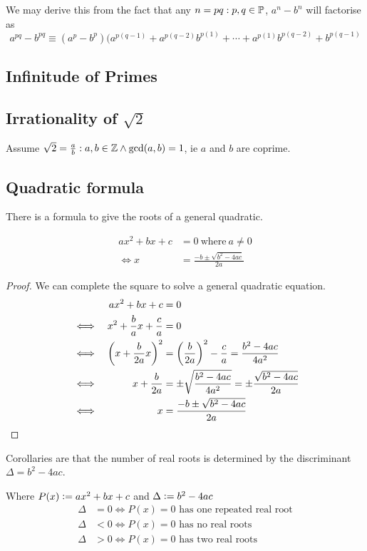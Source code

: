 We may derive this from the fact that any \(n = pq: p, q \in \mathbb P\),
\(a^n - b^n\) will factorise as
\begin{equation}
a^{pq} - b^{pq} \equiv
 (a^p - b^p)(a^{p(q - 1)} + a^{p(q - 2)}b^{p(1)} + \dotsb +
             a^{p(1)}b^{p(q - 2)} + b^{p(q - 1)}
\end{equation}

\subsection{Infinitude of Primes}

\subsection[Irrationality of \(\sqrt 2\)]
           {Irrationality of \boldmath\(\sqrt 2\)}

Assume \(\sqrt 2 = \frac ab : a, b \in \mathbb Z \land \gcd(a, b) = 1\), ie
\(a\) and \(b\) are coprime.

\subsection{Quadratic formula} \label{sec_quad_formula}

There is a formula to give the roots of a general quadratic.
\begin{theorem}
\begin{align*}
ax^2 + bx + c &= 0\ \text{where}\ a \neq 0 \\
\iff x &= \frac{-b \pm \sqrt{b^2 - 4ac}}{2a}
\end{align*}
\end{theorem}
\begin{proof}
We can complete the square to solve a general quadratic equation.
\begin{alignat*}{2}
&&ax^2 + bx + c &= 0 \\
&\iff& x^2 + \frac{b}{a}x + \frac{c}{a} &= 0 \\
&\iff& \pqty{x + \frac{b}{2a}x}^2 &= \pqty{\frac{b}{2a}}^2 - \frac{c}{a}
    = \frac{b^2 - 4ac}{4a^2} \\
&\iff& x + \frac{b}{2a} &= \pm \sqrt{\frac{b^2 - 4ac}{4a^2}}
    = \pm \frac{\sqrt{b^2 - 4ac}}{2a} \\
&\iff& x &= \frac{-b \pm \sqrt{b^2 - 4ac}}{2a} \tag*{\qedhere}
\end{alignat*}
\end{proof}

Corollaries are that the number of real roots is determined by the
discriminant \({\Delta = b^2 - 4ac}\).
\begin{theorem}
Where \(P(x) \vcentcolon= ax^2 + bx + c\) and \(\Delta \vcentcolon= b^2 - 4ac\)
\begin{align*}
\Delta &= 0 \iff \text{\(P(x) = 0\) has one repeated real root} \\
\Delta &< 0 \iff \text{\(P(x) = 0\) has no real roots} \\
\Delta &> 0 \iff \text{\(P(x) = 0\) has two real roots}
\end{align*}
\end{theorem}


